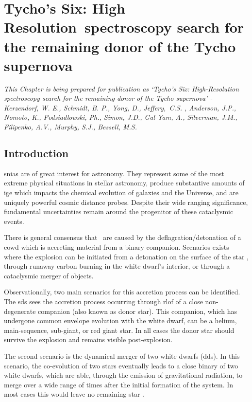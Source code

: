 \chapter[Tycho's Six]{Tycho's Six: High Resolution~spectroscopy search for the remaining donor of the Tycho supernova}
\label{chap:sn1572_hires}
\emph{\small This Chapter is being prepared for publication as `Tycho's Six: High-Resolution spectroscopy search for the remaining donor of the Tycho supernova' - 
Kerzendorf, W. E., Schmidt, B. P., Yong, D., Jeffery,~C.S. ,  Anderson, J.P., Nomoto, K., Podsiadlowski,  Ph., Simon, J.D., Gal-Yam, A., Silverman, J.M., Filipenko, A.V., Murphy, S.J., Bessell, M.S.}

\section{Introduction}
\label{sec:sn1572_hires:introduction}

\glspl{snia} are of great interest for astronomy. They represent some of the most extreme physical situations in stellar astronomy, produce substantive amounts of \gls{ige} which impacts the chemical evolution of galaxies and the Universe, and are uniquely powerful cosmic distance probes. Despite their wide ranging significance, fundamental uncertainties remain around the progenitor of these cataclysmic events. 

There is general consensus that \sneia\ are caused by the deflagration/detonation of a \gls{cowd} which is accreting material from a binary companion. Scenarios exists where the explosion can be initiated from a detonation on the surface of the star \citep{1995ApJ...452...62L, 2010A&A...514A..53F}, through runaway carbon burning in the white dwarf's interior, or through a cataclysmic merger of objects.

Observationally, two main scenarios for this accretion process can be identified. The \gls{sds} sees the accretion process occurring through \gls{rlof} of a close non-degenerate companion (also known as \gls{donor} star). This companion, which has undergone common envelope evolution with the white dwarf, can be a helium, main-sequence, sub-giant, or red giant star. In all cases the donor star should survive the explosion and remains visible post-explosion. 

The second scenario is the  dynamical merger of two white dwarfs (\gls{dds}). In this scenario, the co-evolution of two stars eventually leads to a close binary of two white dwarfs, which are able, through the emission of gravitational radiation, to merge over a wide range of times after the initial formation of the system. In most cases this would leave no remaining star \citep[e.g.][]{2010Natur.463...61P}.

